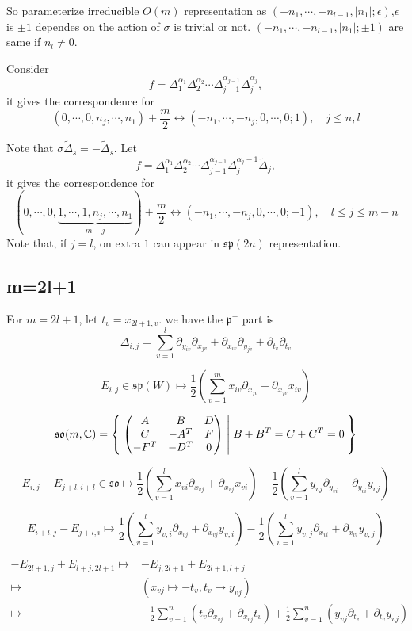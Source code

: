 \documentclass[12pt]{article}
\def\bC{{\mathbb{C}}}
\def\sp{{\mathfrak{sp}}}
\def\tDelta{\widetilde{\Delta}}
\def\aso{\mathfrak{so}}
\def\asp{\mathfrak{sp}}
\def\fpp{\mathfrak{p}}
\begin{document}
So parameterize irreducible $O(m)$ representation as 
$(-n_1, \cdots, -n_{l-1},|n_1|;\epsilon)$,$\epsilon$ is $\pm 1$ dependes on the action 
of $\sigma$ is trivial or not.
$(-n_1,\cdots, -n_{l-1},|n_1|;\pm 1)$ are same if $n_l\neq 0$.   


Consider 
\[
f = \Delta_1^{\alpha_1}\Delta_2^{\alpha_2} \cdots \Delta_{j-1}^{\alpha_{j-1}}
\Delta_j^{\alpha_j},
\]
it gives the correspondence for 
\[
(0,\cdots, 0, n_j, \cdots, n_1) + \frac{m}{2}
\leftrightarrow 
(-n_1, \cdots, -n_j, 0, \cdots, 0;1), \quad j\leq n, l
\]

Note that $\sigma \tDelta_s = -\tDelta_s$. Let
\[
f=\Delta_1^{\alpha_1}\Delta_2^{\alpha_2} \cdots \Delta_{j-1}^{\alpha_{j-1}}
\Delta_j^{\alpha_j-1}\tDelta_j,
\]
it gives the correspondence for 
\[
(0,\cdots, 0,\underbrace{1,\cdots, 1, n_j, \cdots, n_1}_{m-j}) + \frac{m}{2}
\leftrightarrow 
(-n_1, \cdots, -n_j, 0, \cdots, 0;-1), \quad l\leq j \leq m-n
\]
Note that, if $j=l$, on extra $1$ can appear in $\sp(2n)$ representation.

\subsection{m=2l+1}

For $m=2l+1$, let $t_v = x_{2l+1,v}$.  
we have 
the $\fpp^-$ part is 
\[
\Delta_{i,j} = 
\sum_{v=1}^l \partial_{y_{iv}}\partial_{x_{jv}}
+ \partial_{x_{iv}}\partial_{y_{jv}} + \partial_{t_v}\partial_{t_v}
\]


\[
E_{i,j} \in \asp(W)  
 \mapsto \frac{1}{2}(\sum_{v=1}^m x_{iv}\partial_{x_{jv}}+ \partial_{x_{jv}}x_{iv}) 
\]

\[
\aso(m,\bC) = \Set{
\begin{pmatrix} 
A & B & D\\
C & -A^T &F \\
-F^T& -D^T& 0
\end{pmatrix} |
B+B^T=C+C^T=0}
\]

\[
E_{i,j}-E_{j+l,i+l} \in \aso \mapsto 
 \frac{1}{2}(\sum_{v=1}^l x_{vi}\partial_{x_{vj}}+ \partial_{x_{vj}}x_{vi})
-\frac{1}{2}(\sum_{v=1}^l y_{vj}\partial_{y_{vi}}+ \partial_{y_{vi}}y_{vj})
\]

\[
E_{i+l,j}-E_{j+l,i}\mapsto 
 \frac{1}{2}(\sum_{v=1}^l y_{v,i}\partial_{x_{vj}}+\partial_{x_{vj}}y_{v,i})
-\frac{1}{2}(\sum_{v=1}^l y_{v,j}\partial_{x_{vi}}+\partial_{x_{vi}}y_{v,j})
\]

\[
\begin{split}
-E_{2l+1,j}+ E_{l+j,2l+1} \mapsto&
-E_{j,2l+1}+E_{2l+1,l+j} \\
\mapsto&
(x_{vj}\mapsto -t_v, t_v\mapsto y_{vj})\\
\mapsto&
-\frac{1}{2}\sum_{v=1}^n (t_v\partial_{x_{vj}}+\partial_{x_{vj}}t_v)
+\frac{1}{2}\sum_{v=1}^n (y_{vj}\partial_{t_v}+\partial_{t_v}y_{vj})
\end{split}
\]
\end{document}
